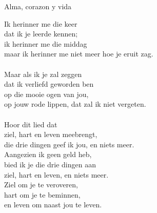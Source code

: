 \begin{song}[vals]{Alma, corazon y vida}
\begin{translation}
Ik herinner me die keer\\
dat ik je leerde kennen;\\
ik herinner me die middag\\
maar ik herinner me niet meer hoe je eruit zag.\\ \\
Maar als ik je zal zeggen\\
dat ik verliefd geworden ben\\
op die mooie ogen van jou,\\
op jouw rode lippen, dat zal ik niet vergeten.\\ \\
Hoor dit lied dat\\
ziel, hart en leven meebrengt,\\
die drie dingen geef ik jou, en niets meer.\\
Aangezien ik geen geld heb,\\
bied ik je die drie dingen aan\\
ziel, hart en leven, en niets meer.\\
Ziel om je te veroveren,\\
hart om je te beminnen,\\
en leven om naast jou te leven.
\end{translation}
\end{song}
